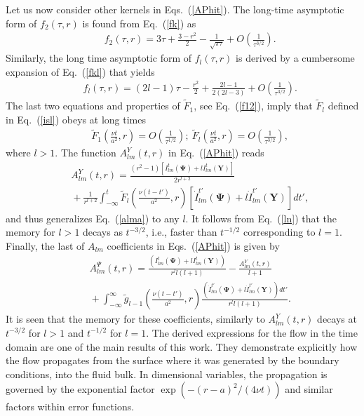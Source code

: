 \documentclass[aps,prx,twocolumn,amsmath,amssymb,amsfonts]{revtex4-2}
\begin{document}
Let us now consider other kernels in Eqs.~(\ref{APhit}). The long-time asymptotic form of $f_2(\tau, r)$ is found from Eq.~(\ref{fk}) as
\begin{eqnarray}&&\!\!\!\!\!\!\!
f_2(\tau, r)\!=\!3\tau+\frac{3-r^2}{2}-\frac{1}{\sqrt{\pi\tau}}+O\left(\frac{1}{\tau^{3/2}}\right).
\end{eqnarray}
Similarly, the long time asymptotic form of $f_l(\tau, r)$ is derived by a cumbersome expansion of Eq.~(\ref{fkl}) that yields
\begin{eqnarray}&&\!\!\!\!\!
f_l(\tau, r)\!=\!(2l\!-\!1)\tau-\frac{r^2}{2}+\frac{2l\!-\!1}{2(2l\!-\!3)}+O\left(\frac{1}{\tau^{3/2}}\right).
\end{eqnarray}
The last two equations and properties of ${\tilde F}_1$, see Eq.~(\ref{f12}), imply that ${\tilde F}_l$ defined in Eq.~(\ref{isl}) obeys at long times
\begin{eqnarray}&&\!\!\!\!\!\!\!\!\!\!\!\!\!
{\tilde F}_1\!\left(\frac{\nu t}{a^2}, r\right)\!=\!\!O\left(\frac{1}{\tau^{1/2}}\right);\
{\tilde F}_{l}\!\left(\frac{\nu t}{a^2}, r\right)\!=\!\!O\left(\frac{1}{\tau^{3/2}}\right), \label{ln}
\end{eqnarray}
where $l>1$.
The function $A_{lm}^{Y}(t, r)$ in Eq.~(\ref{APhit}) reads
\begin{eqnarray}&&
A_{lm}^{Y}(t, r)\! = \!\frac{(r^2\!-\!1)[I_{lm}^{t}(\bm \Psi) \!+\! l I_{lm}^{t}(\bm Y)]}{2r^{l+2}}
\\&&\!\!\!\!\!\!\!
+\frac{1}{r^{l+2}}\int_{-\infty}^{t}\! {\tilde F}_l\left(\frac{\nu(t\!-\!t')}{a^2}, r\right) [\dot{I}_{lm}^{t'}(\bm \Psi) \!+\!  l\dot{I}_{lm}^{t'}(\bm Y)]dt',\nonumber
\end{eqnarray}
and thus generalizes Eq.~(\ref{alma}) to any $l$. It follows from Eq.~(\ref{ln}) that the memory for $l>1$ decays as $t^{-3/2}$, i.e., faster than $t^{-1/2}$ corresponding to $l=1$. Finally, the last of $A_{lm}$ coefficients in Eqs.~(\ref{APhit}) is given by
\begin{eqnarray}&&
A_{lm}^{\Psi}(t, r)\!=\! \frac{\left(I_{lm}^{t}(\bm \Psi) \!+\! l I_{lm}^{t}(\bm Y)\right)}{r^{l}l(l+1)}-\frac{A_{lm}^{Y}(t, r)}{l+1}
\nonumber\\
&&\!\! +\int_{-\infty}^{\infty} \!{\tilde g}_{l-1}\left(\!\frac{\nu(t\!-\!t')}{a^2}, r\!\right)\frac{\left(\dot{I}_{lm}^{t'}(\bm \Psi) \!+\! l \dot{I}_{lm}^{t'}(\bm Y)\right) dt'}{r^{l}l(l+1)}.\end{eqnarray}
It is seen that the memory for these coefficients, similarly to $A_{lm}^{Y}(t, r)$ decays at $t^{-3/2}$ for $l>1$ and $t^{-1/2}$ for $l=1$. The derived expressions for the flow in the time domain are one of the main results of this work. They demonstrate explicitly how the flow propagates from the surface where it was generated by the boundary conditions, into the fluid bulk. In dimensional variables, the propagation is governed by the exponential factor $\exp\left(-(r\!-\!a)^2/(4\nu t)\right)$ and similar factors within error functions.
\end{document}
